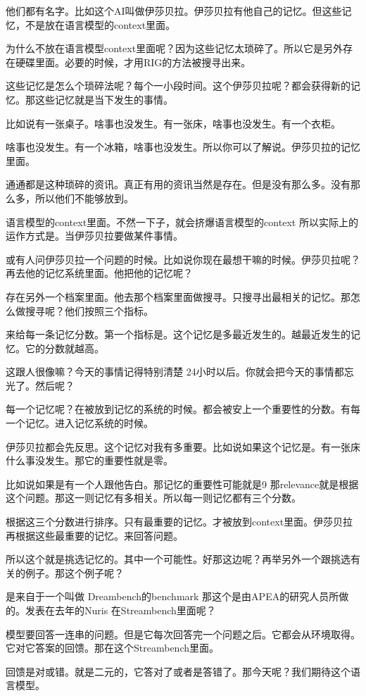 \documentclass[12pt,a4paper]{article}
\begin{document}
他们都有名字。比如这个AI叫做伊莎贝拉。伊莎贝拉有他自己的记忆。但这些记忆，不是放在语言模型的context里面。

为什么不放在语言模型context里面呢？因为这些记忆太琐碎了。所以它是另外存在硬碟里面。必要的时候，才用RIG的方法被搜寻出来。

这些记忆是怎么个琐碎法呢？每个一小段时间。这个伊莎贝拉呢？都会获得新的记忆。那这些记忆就是当下发生的事情。

比如说有一张桌子。啥事也没发生。有一张床，啥事也没发生。有一个衣柜。

啥事也没发生。有一个冰箱，啥事也没发生。所以你可以了解说。伊莎贝拉的记忆里面。

通通都是这种琐碎的资讯。真正有用的资讯当然是存在。但是没有那么多。没有那么多，所以他们不能够放到。

语言模型的context里面。不然一下子，就会挤爆语言模型的context 所以实际上的运作方式是。当伊莎贝拉要做某件事情。

或有人问伊莎贝拉一个问题的时候。比如说你现在最想干嘛的时候。伊莎贝拉呢？再去他的记忆系统里面。他把他的记忆呢？

存在另外一个档案里面。他去那个档案里面做搜寻。只搜寻出最相关的记忆。那怎么做搜寻呢？他们按照三个指标。

来给每一条记忆分数。第一个指标是。这个记忆是多最近发生的。越最近发生的记忆。它的分数就越高。

这跟人很像嘛？今天的事情记得特别清楚 24小时以后。你就会把今天的事情都忘光了。然后呢？

每一个记忆呢？在被放到记忆的系统的时候。都会被安上一个重要性的分数。有每一个记忆。进入记忆系统的时候。

伊莎贝拉都会先反思。这个记忆对我有多重要。比如说如果这个记忆是。有一张床什么事没发生。那它的重要性就是零。

比如说如果是有一个人跟他告白。那记忆的重要性可能就是9 那relevance就是根据这个问题。那这一则记忆有多相关。所以每一则记忆都有三个分数。

根据这三个分数进行排序。只有最重要的记忆。才被放到context里面。伊莎贝拉再根据这些最重要的记忆。来回答问题。

所以这个就是挑选记忆的。其中一个可能性。好那这边呢？再举另外一个跟挑选有关的例子。那这个例子呢？

是来自于一个叫做 Dreambench的benchmark 那这个是由APEA的研究人员所做的。发表在去年的Nuris 在Streambench里面呢？

模型要回答一连串的问题。但是它每次回答完一个问题之后。它都会从环境取得。它对它答案的回馈。那在这个Streambench里面。

回馈是对或错。就是二元的，它答对了或者是答错了。那今天呢？我们期待这个语言模型。
\end{document}
